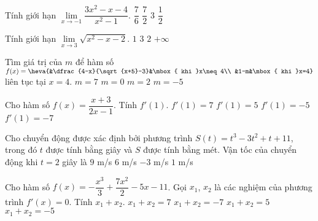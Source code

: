 \begin{ex}%
Tính giới hạn $\lim\limits_{x\to-1}\dfrac{3x^{2}-x-4}{x^{2}-1}$.
\choice
{$\dfrac{7}{6}$}
{\True $\dfrac{7}{2}$}
{$3$}
{$\dfrac{1}{2}$}
\end{ex}

\begin{ex}%
Tính giới hạn $\lim\limits_{x\to 3}\sqrt{x^{2}-x-2}$.
\choice
{$1$}
{$3$}
{\True $2$}
{$+\infty$}
\end{ex}

\begin{ex}%
Tìm giá trị của $m$ để hàm số $f(x)=\heva{&\dfrac{4-x}{\sqrt{x+5}-3}&\mbox{ khi }x\neq 4\\ &1-m&\mbox{ khi }x=4}$ liên tục tại $x=4$.
\choice
{\True $m=7$}
{$m=0$}
{$m=2$}
{$m=-5$}
\end{ex}

\begin{ex}%
Cho hàm số $f(x)=\dfrac{x+3}{2x-1}$. Tính $f'(1)$.
\choice
{$f'(1)=7$}
{$f'(1)=5$}
{$f'(1)=-5$}
{\True $f'(1)=-7$}
\end{ex}

\begin{ex}%
Cho chuyển động được xác định bởi phương trình $S(t)=t^{3}-3t^{2}+t+11$, trong đó $t$ được tính bằng giây và $S$ được tính bằng mét. Vận tốc của chuyển động khi $t=2$ giây là
\choice
{$9$ m/s}
{$6$ m/s}
{$-3$ m/s}
{\True $1$ m/s}
\end{ex}

\begin{ex}%
Cho hàm số $f(x)=-\dfrac{x^{3}}{3}+\dfrac{7x^{2}}{2}-5x-11$. Gọi $x_{1}$, $x_{2}$ là các nghiệm của phương trình $f'(x)=0$. Tính $x_{1}+x_{2}$.
\choice
{$x_{1}+x_{2}=7$}
{\True $x_{1}+x_{2}=-7$}
{$x_{1}+x_{2}=5$}
{$x_{1}+x_{2}=-5$}
\end{ex}

